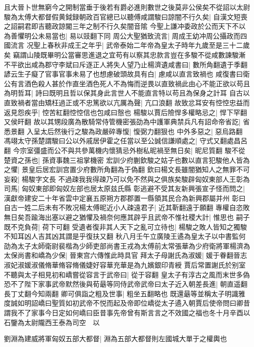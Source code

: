 且大晉卜世無窮今之開制當垂于後若有爵必進則數世之後莫非公侯矣不從詔以太尉駿為太傅大都督假黄鉞録朝政百官總已以聽傅咸謂駿曰諒闇不行久矣|{
	自漢文短喪之詔嗣君即吉聽政諒閽三年之制不行久矣闇音隂}
今聖上謙冲委政於公而天下不以為善懼明公未易當也|{
	易以豉翻下同}
周公大聖猶致流言|{
	周成王幼冲周公攝政而四國流言}
况聖上春秋非成王之年乎|{
	武帝泰始二年帝為皇太子時年九歲至是三十二歲矣}
竊謂山陵既畢明公當審思進退之宜苟有以察其忠款言豈在多駿不從咸數諫駿漸不平欲出咸為郡守李斌曰斥逐正人將失人望乃止楊濟遺咸書曰|{
	數所角翻遺于季翻}
諺云生子癡了官事官事未易了也想慮破頭故具有白|{
	慮咸以直言致禍也}
咸復書曰衛公有言酒色殺人甚於作直坐酒色死人不為悔而逆畏以直致禍此由心不能正欲以苟且為明哲耳|{
	詩曰既明且哲以保其身此言世人不能直言特以苟且為保身之計耳}
自古以直致禍者當由矯枉過正或不忠篤欲以亢厲為聲|{
	亢口浪翻}
故致忿耳安有悾悾忠益而返見怨疾乎|{
	悾苦紅翻悾悾信也包咸曰慤也}
楊駿以賈后險悍多權略忌之|{
	悍下罕翻又侯旰翻}
故以其甥段廣為散騎常侍管機密張劭為中護軍典禁兵凡有詔命帝省訖|{
	省悉景翻}
入呈太后然後行之駿為政嚴碎專愎|{
	愎弼力翻狠也}
中外多惡之|{
	惡烏路翻}
馮翊太守孫楚謂駿曰公以外戚居伊霍之任當以至公誠信謙順處之|{
	守式又翻處昌呂翻}
今宗室彊盛而公不與共參萬機内懷猜忌外樹私昵禍至無日矣|{
	昵尼質翻}
駿不從楚資之孫也|{
	孫資事魏三祖掌機密}
宏訓少府蒯欽駿之姑子也數以直言犯駿他人皆為之懼|{
	景皇后居宏訓宫置少府數所角翻為于偽翻}
欽曰楊文長雖闇猶知人之無罪不可妄殺|{
	楊駿字文長}
不過疎我我得疎乃可以免不然與之俱族矣駿辟匈奴東部人王彰為司馬|{
	匈奴東部即匈奴左部也居太原兹氏縣}
彰逃避不受其友新興張宣子怪而問之|{
	漢獻帝建安二十年省雲中定襄五原朔方郡郡置一縣領其民合為新興郡屬并州}
彰曰自古一姓二后未有不敗况楊太傅昵近小人疎遠君子|{
	近其靳翻遠于願翻}
專權自恣敗無日矣吾踰海出塞以避之猶懼及禍奈何應其辟乎且武帝不惟社稷大計|{
	惟思也}
嗣子既不克負荷|{
	荷下可翻}
受遺者復非其人天下之亂可立待也|{
	楊駿之敗人皆知之獨駿不知耳凶人吉其凶其謂是乎復扶又翻}
秋八月壬午立廣陵王遹為皇太子以中書監何劭為太子太師衛尉裴楷為少師吏部尚書王戎為太傅前太常張華為少府衛將軍楊濟為太保尚書和嶠為少保|{
	晉東宫六傳惟此時具官}
拜太子母謝氏為淑媛|{
	媛于眷翻晉志淑妃淑媛淑儀脩華脩容脩儀婕好容華充華是為九嬪銀印青綬}
賈后常置謝氏於别室不聽與太子相見初和嶠嘗從容言于武帝曰|{
	從于容翻}
皇太子有淳古之風而末世多偽恐不了陛下家事武帝默然後與荀朂等同侍武帝武帝曰太子近入朝差長進|{
	朝直遥翻長丁丈翻今知兩翻}
卿可俱詣之粗及世事|{
	粗坐五翻略也}
既還朂等並稱太子明識雅度誠如明詔嶠曰聖質如初武帝不悦而起及帝即位嶠從太子遹入朝賈后使帝問曰卿昔謂我不了家事今日定如何嶠曰臣昔事先帝曾有斯言言之不效國之福也冬十月辛酉以石鑒為太尉隴西王泰為司空　以

劉淵為建威將軍匈奴五部大都督|{
	淵為五部大都督則左國城大單于之權輿也}


